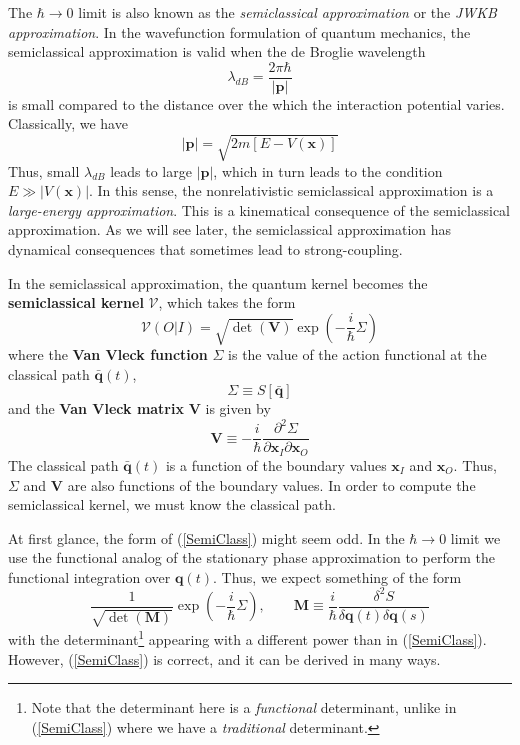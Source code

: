 The $\hbar \rightarrow 0$ limit is also known as the \textit{semiclassical approximation} or the \textit{JWKB approximation}. In the wavefunction formulation of quantum mechanics, the semiclassical approximation is valid when the de Broglie wavelength
\begin{equation}
	\lambda_{dB} = \frac{2 \pi \hbar}{|\mathbf{p}|}
\end{equation}
is small compared to the distance over the which the interaction potential varies. Classically, we have
\begin{equation}
	|\mathbf{p}| = \sqrt{2 m [E - V(\mathbf{x})]}
\end{equation}
Thus, small $\lambda_{dB}$ leads to large $|\mathbf{p}|$, which in turn leads to the condition $E \gg |V(\mathbf{x})|$. In this sense, the nonrelativistic semiclassical approximation is a \textit{large-energy approximation}. This is a kinematical consequence of the semiclassical approximation. As we will see later, the semiclassical approximation has dynamical consequences that sometimes lead to strong-coupling.

In the semiclassical approximation, the quantum kernel becomes the \textbf{semiclassical kernel} $\mathcal{V}$, which takes the form
\begin{equation}
	\mathcal{V}(O|I) = \sqrt{\det{(\mathbf{V})}} \exp{\left(- \frac{i}{\hbar} \Sigma \right)} \label{SemiClass}
\end{equation}
where the \textbf{Van Vleck function} $\Sigma$ is the value of the action functional at the classical path $\bar{\mathbf{q}}(t)$,
\begin{equation}
	\Sigma \equiv S [ \bar{\mathbf{q}} ]
\end{equation}
and the \textbf{Van Vleck matrix} $\mathbf{V}$ is given by
\begin{equation}
	\mathbf{V} \equiv - \frac{i}{\hbar} \frac{\partial^{2} \Sigma}{\partial \mathbf{x}_{I} \partial \mathbf{x}_{O}}
\end{equation}
The classical path $\bar{\mathbf{q}}(t)$ is a function of the boundary values $\mathbf{x}_{I}$ and $\mathbf{x}_{O}$. Thus, $\Sigma$ and $\mathbf{V}$ are also functions of the boundary values. In order to compute the semiclassical kernel, we must know the classical path.

At first glance, the form of (\ref{SemiClass}) might seem odd. In the $\hbar \rightarrow 0$ limit we use the functional analog of the stationary phase approximation to perform the functional integration over $\mathbf{q}(t)$. Thus, we expect something of the form
\begin{equation}
	\frac{1}{\sqrt{\det{(\mathbf{M})}}} \exp{\left( - \frac{i}{\hbar} \Sigma \right)}, \qquad \mathbf{M} \equiv \frac{i}{\hbar} \frac{\delta^{2} S }{\delta \mathbf{q}(t) \delta \mathbf{q}(s)}
\end{equation}
with the determinant\footnote{Note that the determinant here is a \textit{functional} determinant, unlike in (\ref{SemiClass}) where we have a \textit{traditional} determinant.} appearing with a different power than in (\ref{SemiClass}). However, (\ref{SemiClass}) is correct, and it can be derived in many ways.

